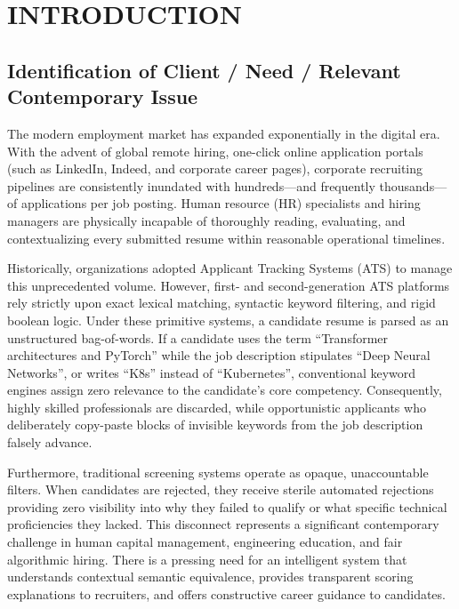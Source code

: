 \documentclass[12pt,a4paper]{report}
\begin{document}
\newpage
{}
\setcounter{page}{1}

\chapter{INTRODUCTION}

\section{Identification of Client / Need / Relevant Contemporary Issue}
The modern employment market has expanded exponentially in the digital era. With the advent of global remote hiring, one-click online application portals (such as LinkedIn, Indeed, and corporate career pages), corporate recruiting pipelines are consistently inundated with hundreds—and frequently thousands—of applications per job posting. Human resource (HR) specialists and hiring managers are physically incapable of thoroughly reading, evaluating, and contextualizing every submitted resume within reasonable operational timelines.

Historically, organizations adopted Applicant Tracking Systems (ATS) to manage this unprecedented volume. However, first- and second-generation ATS platforms rely strictly upon exact lexical matching, syntactic keyword filtering, and rigid boolean logic. Under these primitive systems, a candidate resume is parsed as an unstructured bag-of-words. If a candidate uses the term ``Transformer architectures and PyTorch'' while the job description stipulates ``Deep Neural Networks'', or writes ``K8s'' instead of ``Kubernetes'', conventional keyword engines assign zero relevance to the candidate's core competency. Consequently, highly skilled professionals are discarded, while opportunistic applicants who deliberately copy-paste blocks of invisible keywords from the job description falsely advance.

Furthermore, traditional screening systems operate as opaque, unaccountable filters. When candidates are rejected, they receive sterile automated rejections providing zero visibility into why they failed to qualify or what specific technical proficiencies they lacked. This disconnect represents a significant contemporary challenge in human capital management, engineering education, and fair algorithmic hiring. There is a pressing need for an intelligent system that understands contextual semantic equivalence, provides transparent scoring explanations to recruiters, and offers constructive career guidance to candidates.
\end{document}

